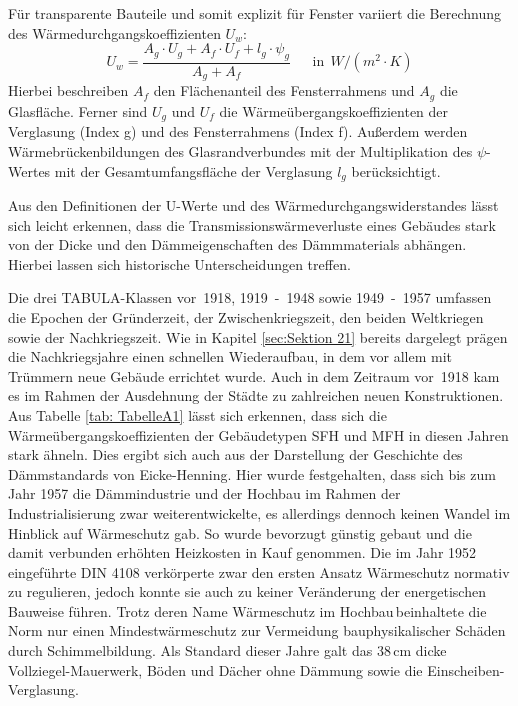 Für transparente Bauteile und somit explizit für Fenster variiert die Berechnung des Wärmedurchgangskoeffizienten \(U_w\):
\begin{equation}
\label{eq:Gleichung223}
U_w = \frac{A_g \cdot U_g + A_f \cdot U_f + l_g \cdot \psi_g}{A_g + A_f}  \ \ \ \ \ \ \ \text{in} \ \ W/(m^2 \cdot K)
\end{equation}
Hierbei beschreiben \(A_f\) den Flächenanteil des Fensterrahmens und \(A_g\) die Glasfläche. Ferner sind \(U_g\) und \(U_f\) die Wärmeübergangskoeffizienten der Verglasung (Index g) und des Fensterrahmens (Index f). 
Außerdem werden Wärmebrückenbildungen des Glasrandverbundes mit der Multiplikation des \(\psi\)-Wertes mit der Gesamtumfangsfläche der Verglasung \(l_g\) berücksichtigt. \cite{Laasch.2013}

Aus den Definitionen der U-Werte und des Wärmedurchgangswiderstandes lässt sich leicht erkennen, dass die Transmissionswärmeverluste eines Gebäudes stark von der Dicke und den Dämmeigenschaften des Dämmmaterials abhängen. 
Hierbei lassen sich historische Unterscheidungen treffen.

Die drei TABULA-Klassen \mbox{vor 1918}, \mbox{1919 - 1948} sowie \mbox{1949 - 1957} umfassen die Epochen der Gründerzeit, der Zwischenkriegszeit, den beiden Weltkriegen sowie der Nachkriegszeit. 
Wie in Kapitel \ref{sec:Sektion 21} bereits dargelegt prägen die Nachkriegsjahre einen schnellen Wiederaufbau, in dem vor allem mit Trümmern neue Gebäude errichtet wurde. 
Auch in dem Zeitraum \mbox{vor 1918} kam es im Rahmen der Ausdehnung der Städte zu zahlreichen neuen Konstruktionen. 
Aus Tabelle \ref{tab: TabelleA1} lässt sich erkennen, dass sich die Wärmeübergangskoeffizienten der Gebäudetypen SFH und MFH in diesen Jahren stark ähneln. 
Dies ergibt sich auch aus der Darstellung der Geschichte des Dämmstandards von Eicke-Henning. %
Hier wurde festgehalten, dass sich bis zum Jahr 1957 die Dämmindustrie und der Hochbau im Rahmen der Industrialisierung zwar weiterentwickelte, es allerdings dennoch keinen Wandel im Hinblick auf Wärmeschutz gab.
So wurde bevorzugt günstig gebaut und die damit verbunden erhöhten Heizkosten in Kauf genommen.
Die im Jahr 1952 eingeführte DIN 4108 verkörperte zwar den ersten Ansatz Wärmeschutz normativ zu regulieren, jedoch konnte sie auch zu keiner Veränderung der energetischen Bauweise führen. 
Trotz deren Name \glqq Wärmeschutz im Hochbau\grqq\,beinhaltete die Norm nur einen Mindestwärmeschutz zur Vermeidung bauphysikalischer Schäden durch Schimmelbildung.
Als Standard dieser Jahre galt das 38\,cm dicke Vollziegel-Mauerwerk, Böden und Dächer ohne Dämmung sowie die Einscheiben-Verglasung. \cite{EickeHenning.2011}

